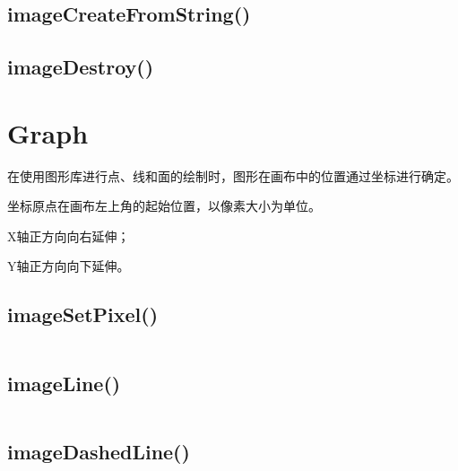 \begin{lstlisting}[language=PHP]

\end{lstlisting}

\subsection{imageCreateFromString()}



\subsection{imageDestroy()}


\section{Graph}



在使用图形库进行点、线和面的绘制时，图形在画布中的位置通过坐标进行确定。


\begin{compactitem}
\item 坐标原点在画布左上角的起始位置，以像素大小为单位。
\item X轴正方向向右延伸；
\item Y轴正方向向下延伸。
\end{compactitem}

\subsection{imageSetPixel()}


\begin{lstlisting}[language=PHP]

\end{lstlisting}


\subsection{imageLine()}


\begin{lstlisting}[language=PHP]

\end{lstlisting}



\subsection{imageDashedLine()}



